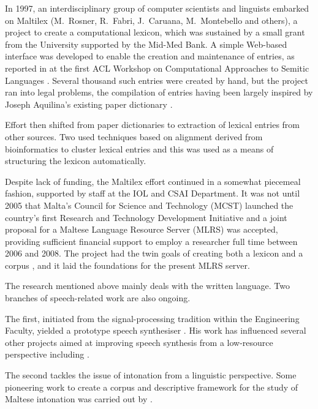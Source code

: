 \begin{multicols}{2}
In 1997, an interdisciplinary group of computer scientists and linguists  embarked on Maltilex (M.~Rosner, R.~Fabri, J.~Caruana, M.~Montebello and others), a project to create a computational lexicon, which was sustained by a small grant from the University supported by the Mid-Med Bank. A simple Web-based interface was developed to enable the creation and maintenance of entries, as reported in \cite{Rosner-et-al:1998} at the first ACL Workshop on Computational Approaches to Semitic Languages \cite{Rosner:1998}. Several thousand such entries were created by hand, but the project ran into legal problems, the compilation of entries having been largely inspired by Joseph Aquilina's existing paper dictionary \cite{Aquilina:1987,Aquilina:1990}.

Effort then shifted from paper dictionaries to extraction of lexical entries from other sources. Two \cite{Dalli:2001, Attard:2005} used techniques based on alignment derived from bioinformatics to cluster lexical entries and this was used as a means of structuring the lexicon automatically. 

Despite lack of funding, the Maltilex effort continued in a somewhat piecemeal fashion, supported by staff at the IOL and CSAI Department. It was not until 2005 that Malta's Council for Science and Technology (MCST) launched the country's first Research and Technology Development Initiative and a joint proposal for a Maltese Language Resource Server (MLRS) was accepted, providing sufficient financial support to employ a researcher full time between 2006 and 2008. The project had the twin goals of creating both a lexicon and a corpus \cite{Rosner:2009}, and it laid the foundations for the present MLRS server.

The research mentioned above mainly deals with the written language. Two branches of speech-related work are also ongoing. 

The first, initiated from the signal-processing tradition within the Engineering Faculty, yielded a prototype speech synthesiser \cite{Micallef:1997}. His work has influenced several other projects aimed at improving speech synthesis from a low-resource perspective including \cite{Calleja:2002, Farrugia:2005, Camilleri:2010, Borg-et-al:2011}.

The second tackles the issue of intonation \cite{Vella:2009} from a linguistic perspective. Some pioneering work to create a corpus and descriptive framework for the study of Maltese intonation was carried out by \cite{Vella-Farrugia:2006}. 
\columnbreak


\end{multicols}
